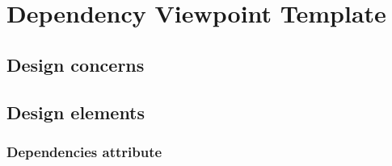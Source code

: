 \chapter{Dependency Viewpoint Template} \label{chp:dependency-viewpoint-template}
	\begin{comment}
		The Dependency viewpoint specifies the relationships of interconnection and access among entities. These
		relationships include shared information, order of execution, or parameterization of interfaces.
	\end{comment}
	
	\section{Design concerns} \label{s:dependency-viewpoint-template:design-concerns}
		\begin{comment}
			A Dependency view provides an overall picture of the design subject in order to assess the impact of
			requirements or design changes. It can help maintainers to isolate entities causing system failures or
			resource bottlenecks. It can aid in producing the system integration plan by identifying the entities that are
			needed by other entities and that must be developed first. This description can also be used by integration
			testing to aid in the production of integration test cases.
		\end{comment}
	
	\section{Design elements} \label{s:dependency-viewpoint-template:design-elements}
		\begin{comment}
			Design entities: subsystem, component, and module.
			
			Design relationships: uses, provides, and requires.
			
			Design attribute: name (4.6.2.1), type (4.6.2.2), purpose (4.6.2.3), dependencies (5.5.2.1), and resources.
			These attributes should be provided for all design entities.
		\end{comment}
	
		\subsection{Dependencies attribute} \label{s:dependency-viewpoint-template:dependencies-attribute}
			\begin{comment}
				A description of the relationships of this entity with other entities. The dependencies attribute identifies the
				uses or requires the presence of relationship for an entity. This attribute is used to describe the nature of
				each interaction including such characteristics as timing and conditions for interaction. The interactions
				involve the initiation, order of execution, data sharing, creation, duplicating, usage, storage, or destruction
				of entities.
				NOTE—This design entity attribute is retained for compatibility with IEEE Std 1016-1998.
			\end{comment}
			
